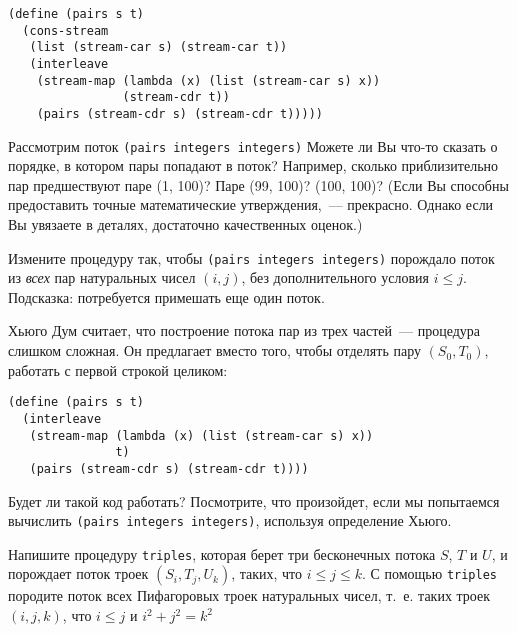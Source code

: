 \begin{Verbatim}[fontsize=\small]
(define (pairs s t)
  (cons-stream
   (list (stream-car s) (stream-car t))
   (interleave
    (stream-map (lambda (x) (list (stream-car s) x))
                (stream-cdr t))
    (pairs (stream-cdr s) (stream-cdr t)))))
\end{Verbatim}
\begin{exercise}{3.66}\label{EX3.66}%
Рассмотрим поток {\tt (pairs integers integers)}
Можете ли Вы что-то сказать о порядке, в котором пары попадают в
поток? Например, сколько приблизительно пар предшествуют паре (1,
100)? Паре (99, 100)? (100, 100)?  (Если Вы способны предоставить
точные математические утверждения,~--- прекрасно. Однако если Вы увязаете
в деталях, достаточно качественных оценок.)
\end{exercise}
\begin{exercise}{3.67}\label{EX3.67}%
Измените процедуру так, чтобы {\tt (pairs
integers integers)} порождало поток из {\em всех} пар
натуральных чисел $(i,j)$, без дополнительного условия
$i \leq j$.  Подсказка: потребуется примешать еще один
поток.
\end{exercise}
\begin{exercise}{3.68}\label{EX3.68}%
Хьюго Дум считает, что построение потока пар из трех
частей~--- процедура слишком сложная.  Он предлагает вместо того,
чтобы отделять пару $(S_0, T_0)$, работать с первой строкой
целиком:

\begin{Verbatim}[fontsize=\small]
(define (pairs s t)
  (interleave
   (stream-map (lambda (x) (list (stream-car s) x))
               t)
   (pairs (stream-cdr s) (stream-cdr t))))
\end{Verbatim}
Будет ли такой код работать?  Посмотрите, что произойдет, если мы
попытаемся вычислить {\tt (pairs integers integers)}, используя
определение Хьюго.
\end{exercise}
\begin{exercise}{3.69}\label{EX3.69}%
Напишите процедуру {\tt triples}, которая
берет три бесконечных потока $S$, $T$ и
$U$, и порождает поток троек $(S_i, T_j, U_k)$,
таких, что $i \leq j \leq k$.  С помощью
{\tt triples} породите поток всех Пифагоровых троек натуральных
чисел, т.~е. таких троек $(i,j,k)$, что $i \leq
j$ и $i^2 + j^2 = k^2$
\end{exercise}
